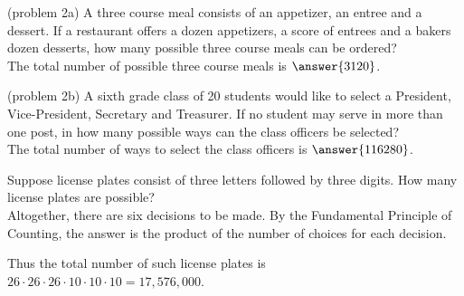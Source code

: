 \documentclass[handout]{ximera}
\begin{document}
\begin{problem}(problem 2a)
A three course meal consists of an appetizer, an entree and a dessert. 
If a restaurant offers a dozen appetizers, a score of entrees and a bakers dozen desserts, 
how many possible three course meals can be ordered?\\
The total number of possible three course meals is $\answer{3120}$.
\end{problem}

\begin{problem}(problem 2b)
A sixth grade class of 20 students would like to select a President, Vice-President, Secretary and Treasurer.
If no student may serve in more than one post, in how many possible ways can the class officers be selected?\\
The total number of ways to select the class officers is $\answer{116280}$.
\end{problem}


\begin{example}[example 3]
Suppose license plates consist of three letters followed by three digits. How many license plates are possible?\\
Altogether, there are six decisions to be made. By the Fundamental Principle of Counting, the answer is the
product of the number of choices for each decision.

\begin{image}
\end{image}
Thus the total number of such license plates is $26 \cdot 26 \cdot 26 \cdot 10\cdot 10\cdot 10 = 17,576,000$.

\end{example}
\end{document}
